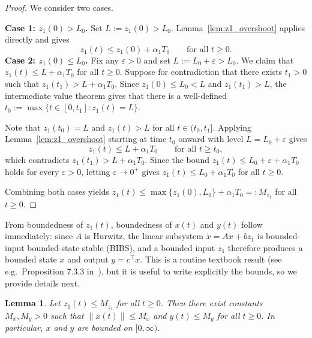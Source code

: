 \documentclass{article}
\newtheorem{lemma}{Lemma}
\begin{document}
\begin{proof}
    We consider two cases.
    
    \textbf{Case 1: $z_1(0)>L_0$.} Set $L:=z_1(0)>L_0$. 
    Lemma~\ref{lem:z1_overshoot} applies directly and gives
    \begin{equation*}
        z_1(t) \le z_1(0)+\alpha_1 T_0 \qquad\text{for all } t\ge 0.
    \end{equation*}
    \textbf{Case 2: $z_1(0)\le L_0$.} Fix any $\varepsilon>0$ and set 
    $L:=L_0+\varepsilon>L_0$. We claim that $z_1(t)\leq L+\alpha_1T_0$ for all $t\ge 0$.
    Suppose for contradiction that there exists 
    $t_1>0$ such that $z_1(t_1)>L+\alpha_1 T_0$. Since $z_1(0)\le L_0<L$ and $z_1(t_1)>L$,
    the intermediate value theorem gives that there is a well-defined $t_0 := \max\{t\in[0,t_1] : z_1(t)=L\}$. 
    
    Note that $z_1(t_0)=L$ and $z_1(t)>L$ for all $t\in(t_0,t_1]$. 
    Applying Lemma~\ref{lem:z1_overshoot} starting at time \(t_0\) onward with level \(L=L_0+\varepsilon\) gives
    \begin{equation*}
        z_1(t) \le L+\alpha_1 T_0 \qquad\text{for all } t\ge t_0,
    \end{equation*}
    which contradicts $z_1(t_1)>L+\alpha_1 T_0$. Since the bound 
    $z_1(t)\le L_0+\varepsilon+\alpha_1 T_0$ holds for every $\varepsilon>0$, 
    letting $\varepsilon\to 0^+$ gives $z_1(t)\le L_0+\alpha_1 T_0$ for all 
    $t\ge 0$.
    
    Combining both cases yields $z_1(t)\le\max\{z_1(0),L_0\}+\alpha_1 T_0
    =:M_{z_1}$ for all $t\ge 0$.
\end{proof}

From boundedness of $z_1(t)$, boundedness of $x(t)$ and $y(t)$ follow 
immediately: since $A$ is Hurwitz, the linear subsystem $\dot x = Ax + bz_1$ 
is bounded-input bounded-state stable (BIBS), and a bounded input $z_1$ therefore 
produces a bounded state $x$ and output $y = c^\top x$.
This is a routine textbook result (see e.g.\ Proposition 7.3.3 in~\cite{mct}), but it is useful to write explicitly the bounds, so we provide details next.

\begin{lemma}\label{lem:x_bounded}
    Let $z_1(t)\le M_{z_1}$ for all $t\ge 0$. Then there exist constants 
    $M_x, M_y>0$ such that $\|x(t)\| \le M_x$ and $y(t) \le M_y$ for all $t\ge 0$.
    In particular, $x$ and $y$ are bounded on $[0,\infty)$.
\end{lemma}
\end{document}
